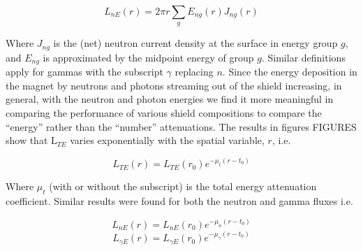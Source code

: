 \documentclass[11pt]{report} %
\begin{document}
\begin{equation}
  L_{nE}(r) = 2 \pi r \sum_g E_{ng} (r) J_{ng} (r)
\end{equation}

Where $J_{ng}$ is the (net) neutron current density at the surface in energy group $g$, and $E_{ng}$ is approximated by the midpoint energy of group $g$. Similar definitions apply for gammas with the subscript $\gamma$ replacing $n$. Since the energy deposition in the magnet by neutrons and photons streaming out of the shield increasing, in general, with the neutron and  photon energies we find it more meaningful in comparing the performance of various shield compositions to compare the “energy” rather than the “number” attenuations.
The results in figures FIGURES show that L$_{TE}$ varies exponentially with the spatial variable, $r$, i.e.

\begin{equation}
L_{TE} (r) = L_{TE} (r_0) e^{-\mu_t (r-t_0)}
\end{equation}

Where $\mu_t$ (with or without the subscript) is the total energy attenuation coefficient. Similar results were found for both the neutron and gamma fluxes i.e.

\begin{equation}
L_{nE} (r) = L_{nE} (r_0) e^{-\mu_n (r-t_0)}
\end{equation}
\begin{equation}
L_{\gamma E} (r) = L_{\gamma E} (r_0) e^{-\mu_{\gamma} (r-t_0)}
\end{equation}
\end{document}
